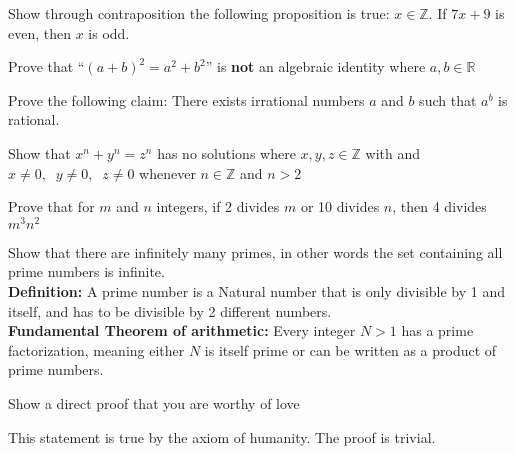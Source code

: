 \documentclass[addpoints]{exam}
\begin{document}
\begin{questions}
\begin{solution}
\end{solution}


\question
Show through contraposition the following proposition is true: $x \in \mathbb{Z}$. If $7x + 9$ is even, then $x$ is odd.


\begin{solution}
\end{solution}


\question
Prove that ``$(a+b)^2 = a^2 +b^2$'' is \textbf{not} an algebraic identity where $a,b \in \mathbb{R}$
  \begin{solution}

  \end{solution}


\question Prove the following claim: There exists irrational numbers $a$ and $b$ such that $a^b$ is rational.
\begin{solution}
\end{solution}

\question Show that $x^n + y^n = z^n$ has no solutions where $x, y,z \in \mathbb{Z}$ with and $x \neq 0, \;\; y \neq 0,\;\;z \neq 0$ whenever $n\in \mathbb{Z}$ and $n > 2$
\begin{solution}
\end{solution}

\question Prove that for $m$ and $n$ integers, if 2 divides $m$ or 10 divides $n$, then 4 divides $m^{3}n^{2}$
\begin{solution}

\end{solution}


\question Show that there are infinitely many primes, in other words the set containing all prime numbers is infinite.
\\\textbf{Definition:} A prime number is a Natural number that is only divisible by 1 and itself, and has to be divisible by 2 different numbers.
\\\textbf{Fundamental Theorem of arithmetic:} Every integer $N > 1$ has a prime factorization, meaning either $N$ is itself prime or can be written as a product of prime numbers.
\begin{solution}

\end{solution}


\question Show a direct proof that you are worthy of love
\begin{solution}
This statement is true by the axiom of humanity. The proof is trivial.
\end{solution}


\end{questions}
\end{document}
